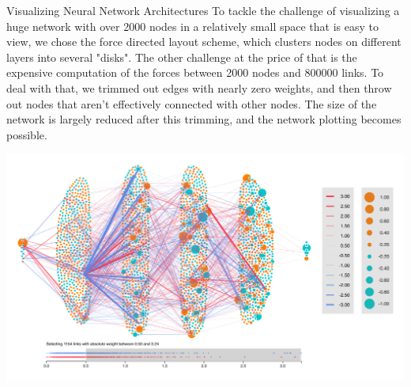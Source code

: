 \documentclass[final,hyperref={pdfpagelabels=false}]{beamer}
\begin{document}
\begin{frame}{}
\begin{columns}[t]
\begin{column}{.4\linewidth}
\begin{block}{Visualizing Neural Network Architectures}
      \bigskip
      To tackle the challenge of visualizing a huge network with over 2000 nodes in a relatively small space that is easy to view, we chose the force directed layout scheme, which clusters nodes on different layers into several "disks". The other challenge at the price of that is the expensive computation of the forces between 2000 nodes and 800000 links. To deal with that, we trimmed out edges with nearly zero weights, and then throw out nodes that aren't effectively connected with other nodes. The size of the network is largely reduced after this trimming, and the network plotting becomes possible.
       \vspace{0cm}
       \begin{center}
                \includegraphics[scale=0.7]{NNmax1.png}
      \end{center}
      \vspace{3cm}
      \end{block}
      \end{column}
      

\end{columns}
\end{frame}
\end{document}

